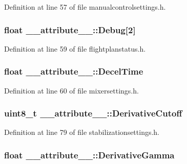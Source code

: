 \-Definition at line 57 of file manualcontrolsettings.\-h.

\hypertarget{struct____attribute_____a5492a5a76ef841156edca6107e59e937}{
\subsubsection[{\-Debug}]{\setlength{\rightskip}{0pt plus 5cm}float {\bf \-\_\-\-\_\-attribute\-\_\-\-\_\-\-::\-Debug}\mbox{[}2\mbox{]}}}\label{struct____attribute_____a5492a5a76ef841156edca6107e59e937}


\-Definition at line 59 of file flightplanstatus.\-h.

\hypertarget{struct____attribute_____a8f2efafb7230853a9e75635931e1505d}{
\subsubsection[{\-Decel\-Time}]{\setlength{\rightskip}{0pt plus 5cm}float {\bf \-\_\-\-\_\-attribute\-\_\-\-\_\-\-::\-Decel\-Time}}}\label{struct____attribute_____a8f2efafb7230853a9e75635931e1505d}


\-Definition at line 60 of file mixersettings.\-h.

\hypertarget{struct____attribute_____a6b5377feee1094a7a2f64fc2edadced5}{
\subsubsection[{\-Derivative\-Cutoff}]{\setlength{\rightskip}{0pt plus 5cm}uint8\-\_\-t {\bf \-\_\-\-\_\-attribute\-\_\-\-\_\-\-::\-Derivative\-Cutoff}}}\label{struct____attribute_____a6b5377feee1094a7a2f64fc2edadced5}


\-Definition at line 79 of file stabilizationsettings.\-h.

\hypertarget{struct____attribute_____a4f6b4045cef3ca578c01222974678422}{
\subsubsection[{\-Derivative\-Gamma}]{\setlength{\rightskip}{0pt plus 5cm}float {\bf \-\_\-\-\_\-attribute\-\_\-\-\_\-\-::\-Derivative\-Gamma}}}\label{struct____attribute_____a4f6b4045cef3ca578c01222974678422}


